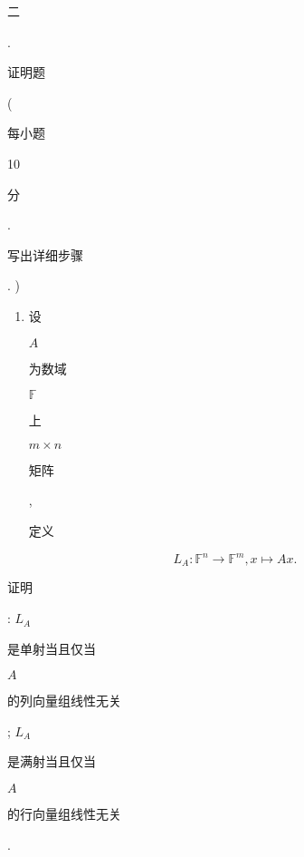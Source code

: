 \documentclass[10pt]{article}
\begin{document}
\begin{CJK}{UTF8}{mj}二\end{CJK}. \begin{CJK}{UTF8}{mj}证明题\end{CJK} (\begin{CJK}{UTF8}{mj}每小题\end{CJK} 10 \begin{CJK}{UTF8}{mj}分\end{CJK}. \begin{CJK}{UTF8}{mj}写出详细步骤\end{CJK}. )

\begin{enumerate}
  \item \begin{CJK}{UTF8}{mj}设\end{CJK} $A$ \begin{CJK}{UTF8}{mj}为数域\end{CJK} $\mathbb{F}$ \begin{CJK}{UTF8}{mj}上\end{CJK} $m \times n$ \begin{CJK}{UTF8}{mj}矩阵\end{CJK}, \begin{CJK}{UTF8}{mj}定义\end{CJK}
\end{enumerate}
$$
L_{A}: \mathbb{F}^{n} \rightarrow \mathbb{F}^{m}, x \mapsto A x .
$$
\begin{CJK}{UTF8}{mj}证明\end{CJK}: $L_{A}$ \begin{CJK}{UTF8}{mj}是单射当且仅当\end{CJK} $A$ \begin{CJK}{UTF8}{mj}的列向量组线性无关\end{CJK}; $L_{A}$ \begin{CJK}{UTF8}{mj}是满射当且仅当\end{CJK} $A$ \begin{CJK}{UTF8}{mj}的行向量组线性无关\end{CJK}.
\end{document}
